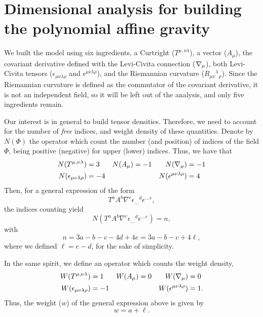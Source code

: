 \section{\label{DA}Dimensional analysis for building the polynomial affine gravity}

We built the model using six ingredients, a Curtright ($T^{\mu,\nu\lambda}$), a vector ($A_\mu$), the covariant derivative defined with the Levi-Civita connection ($\nabla_{{\mu}}$), both Levi-Civita tensors ($\epsilon_{\mu\nu\lambda\rho}$ and $\epsilon^{\mu\nu\lambda\rho}$), and the Riemannian curvature ($R_{\mu\nu}{}^\lambda{}_\rho$).
Since the Riemannian curvature is defined as the commutator of the covariant derivative, it is not an independent field, so it will be left out of the analysis, and only five ingredients remain.

Our interest is in general to build tensor densities. Therefore, we need to account for the number of \emph{free} indices, and weight density of these quantities. Denote by $N(\Phi)$  the operator which count the number (and position) of indices of the field $\Phi$, being positive (negative) for upper (lower) indices. Thus, we have that
\begin{equation*}
  \begin{aligned}
    N( T^{\mu,\nu\lambda} ) &= 3 & N( A_\mu ) &= -1 & N(  \nabla_{{\mu}} ) &= -1 \\
    N( \epsilon_{\mu\nu\lambda\rho} ) &= -4 & & & N( \epsilon^{\mu\nu\lambda\rho} ) &= 4 
  \end{aligned}
\end{equation*}
Then, for a general expression of the form
\begin{equation*}
  T^a A^b \nabla^c {\epsilon_{\dots}}^d {\epsilon^{\dots}}^e,
\end{equation*}
the indices counting yield
\begin{equation}
  N( T^a A^b \nabla^c {\epsilon_{\dots}}^d {\epsilon^{\dots}}^e ) = n,
\end{equation}
with
\begin{equation}
  n = 3a -b -c -4d + 4e = 3 a -b - c + 4 \ell,
  \label{ni}
\end{equation}
where we defined $\ell = e - d$, for the sake of simplicity.

In the same spirit, we define an operator which counts the weight density,
\begin{equation*}
  \begin{aligned}
    W( T^{\mu,\nu\lambda} ) &= 1 & W( A_\mu ) &= 0 & W(  \nabla_{{\mu}} ) &= 0 \\
    W( \epsilon_{\mu\nu\lambda\rho} ) &= -1 & & & W( \epsilon^{\mu\nu\lambda\rho} ) &= 1 .
  \end{aligned}
\end{equation*}
Thus, the weight ($w$) of the general expression above is given by
\begin{equation}
  w = a + \ell.
  \label{wd}
\end{equation}

